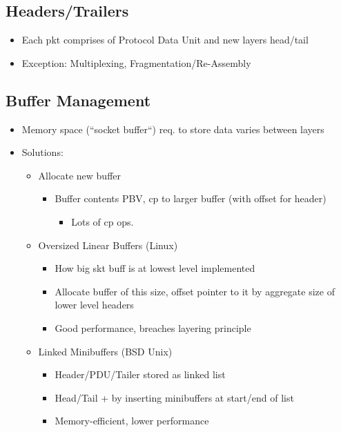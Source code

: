 \subsection{Headers/Trailers}

\begin{itemize}
	\item Each pkt comprises of Protocol Data Unit and new layers head/tail
	\item Exception: Multiplexing, Fragmentation/Re-Assembly
\end{itemize}

\subsection{Buffer Management}

\begin{itemize}
	\item Memory space (``socket buffer``) req. to store data varies between
		layers
	\item Solutions:
	\begin{itemize}
		\item Allocate new buffer
		\begin{itemize}
			\item Buffer contents PBV, cp to larger buffer (with
				offset for header)
			\begin{itemize}
				\item Lots of cp ops.
			\end{itemize}
		\end{itemize}
		\item Oversized Linear Buffers (Linux)
		\begin{itemize}
			\item How big skt buff is at lowest level implemented
			\item Allocate buffer of this size, offset pointer to it
				by aggregate size of lower level headers
			\item Good performance, breaches layering principle
		\end{itemize}
		\item Linked Minibuffers (BSD Unix)
		\begin{itemize}
			\item Header/PDU/Tailer stored as linked list
			\item Head/Tail + by inserting minibuffers at start/end
				of list
			\item Memory-efficient, lower performance
		\end{itemize}
	\end{itemize}
\end{itemize}
